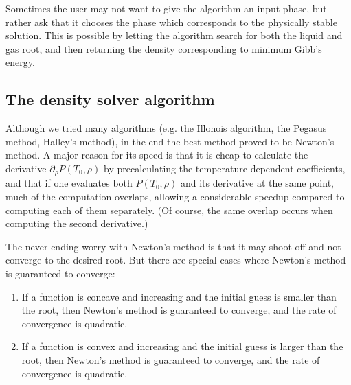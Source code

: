 \documentclass[english]{../thermomemo/thermomemo}
\numberwithin{equation}{section}
\begin{document}
Sometimes the user may not want to give the algorithm an input phase,
but rather ask that it chooses the phase which corresponds to the physically
stable solution. This is possible by letting the algorithm search for
both the liquid and gas root, and then returning the density
corresponding to minimum Gibb's energy.

\subsection{The density solver algorithm}
Although we tried many algorithms (e.g. the Illonois algorithm, the
Pegasus method, Halley's method), in the end the best method
proved to be Newton's method. A major reason for its speed is that
it is cheap to calculate the derivative $\partial_\rho P(T_0,\rho)$ by precalculating the temperature dependent coefficients, and
that if one evaluates both $P(T_0,\rho)$ and its derivative at the
same point, much of the computation overlaps, allowing a considerable
speedup compared to computing each of them separately. (Of course, the same overlap occurs when computing the second derivative.)

The never-ending worry with Newton's method is that it may shoot off
and not converge to the desired root. But there are special cases where
Newton's method is guaranteed to converge:
\begin{enumerate}
\item If a function is concave and increasing and the initial guess is
  smaller than the root, then Newton's method is guaranteed to
  converge, and the rate of convergence is quadratic.
\item If a function is convex and increasing and the initial guess is
  larger than the root, then Newton's method is guaranteed to
  converge, and the rate of convergence is quadratic.
\end{enumerate}
\end{document}
